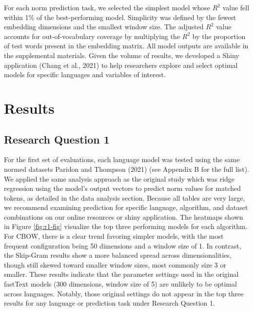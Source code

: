 \documentclass[
  man,floatsintext]{apa6}
\begin{document}
For each norm prediction task, we selected the simplest model whose \(R^2\) value fell within 1\% of the best-performing model. Simplicity was defined by the fewest embedding dimensions and the smallest window size. The adjusted \(R^2\) value accounts for out-of-vocabulary coverage by multiplying the \(R^2\) by the proportion of test words present in the embedding matrix. All model outputs are available in the supplemental materials. Given the volume of results, we developed a Shiny application (Chang et al., 2021) to help researchers explore and select optimal models for specific languages and variables of interest.

\section{Results}\label{results}

\subsection{Research Question 1}\label{research-question-1}

For the first set of evaluations, each language model was tested using the same normed datasets Paridon and Thompson (2021) (see Appendix B for the full list). We applied the same analysis approach as the original study which was ridge regression using the model's output vectors to predict norm values for matched tokens, as detailed in the data analysis section. Because all tables are very large, we recommend examining prediction for specific language, algorithm, and dataset combinations on our online resources or shiny application. The heatmaps shown in Figure \ref{fig:r1-fig} visualize the top three performing models for each algorithm. For CBOW, there is a clear trend favoring simpler models, with the most frequent configuration being 50 dimensions and a window size of 1. In contrast, the Skip-Gram results show a more balanced spread across dimensionalities, though still skewed toward smaller window sizes, most commonly size 3 or smaller. These results indicate that the parameter settings used in the original fastText models (300 dimensions, window size of 5) are unlikely to be optimal across languages. Notably, those original settings do not appear in the top three results for any language or prediction task under Research Question 1.
\end{document}
